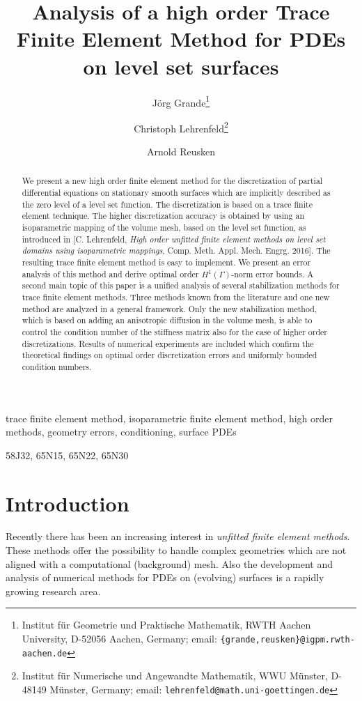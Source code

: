 \documentclass[final]{siamltex}
\title{Analysis of a high order Trace Finite Element Method for PDEs on level set surfaces}
\author{
J\"org Grande\thanks{Institut f\"ur
Geometrie und Praktische Mathematik, RWTH Aachen University, D-52056 Aachen,
Germany; email: {\tt \{grande,reusken\}@igpm.rwth-aachen.de}}
\and
Christoph Lehrenfeld\thanks{Institut f\"ur Numerische und Angewandte Mathematik, WWU M\"unster, D-48149 M\"unster,
Germany; email: {\tt lehrenfeld@math.uni-goettingen.de}}
\and
Arnold Reusken\footnotemark[1] 
}
\begin{document}
\maketitle
\begin{abstract}
We present a new high order finite element method for the discretization of partial differential equations on stationary smooth surfaces which are implicitly described as the zero level of a level set function. The discretization is based on a trace finite element technique. The higher discretization accuracy is obtained by using an isoparametric mapping of the volume mesh, based on the level set function, as introduced in [C. Lehrenfeld, \emph{High order unfitted finite element methods on level set domains using isoparametric mappings}, Comp. Meth. Appl. Mech. Engrg. 2016]. The resulting trace finite element method is easy to implement. We present an error analysis of this method and derive optimal order $H^1(\Gamma)$-norm error bounds. A second main topic of this paper 
 is a unified analysis of several stabilization methods for trace finite element methods. Three methods known from the literature and one new method are analyzed in a general framework. Only the new stabilization method, which is based on adding an anisotropic diffusion in the volume mesh, is able to control the condition number of the stiffness matrix also for the case of higher order discretizations. Results of numerical experiments are included which confirm the theoretical findings on optimal order discretization errors and uniformly bounded condition numbers.
\end{abstract}

\begin{keywords} 
trace finite element method,
isoparametric finite element method,
high order methods,
geometry errors,
conditioning,
surface PDEs
 \end{keywords}
 \begin{AMS} 
   58J32, 65N15, 65N22, 65N30
 \end{AMS}

\section[Introduction]{Introduction}\label{sec:introduction}
Recently there has been an increasing interest in \emph{unfitted finite element methods}. These methods offer the possibility to handle complex geometries which are not aligned with a computational (background) mesh. Also the development and analysis of numerical methods for PDEs on (evolving) surfaces is a rapidly growing research area.
\end{document}
